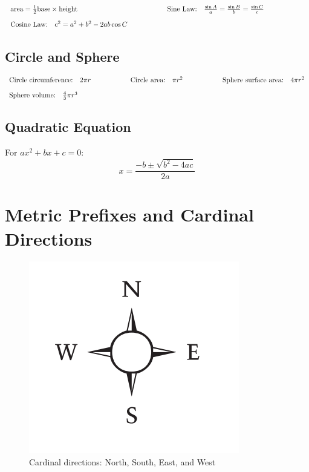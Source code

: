 \documentclass[12pt,a4paper]{article}
\begin{document}
\begin{align*}
  \begin{array}{l@{\hspace{2cm}}l@{\hspace{2cm}}l}
    \text{area} = \frac{1}{2} \text{base} \times \text{height} & \text{Sine Law:} \quad \frac{\sin A}{a} = \frac{\sin B}{b} = \frac{\sin C}{c} & \\[1em]
    \text{Cosine Law:} \quad c^2 = a^2 + b^2 - 2ab \cos C & &
  \end{array}
\end{align*}

\subsection{Circle and Sphere}
\begin{align*}
  \begin{array}{l@{\hspace{2cm}}l@{\hspace{2cm}}l}
    \text{Circle circumference:} \quad 2\pi r & \text{Circle area:} \quad \pi r^2 & \text{Sphere surface area:} \quad 4\pi r^2 \\[1em]
    \text{Sphere volume:} \quad \frac{4}{3}\pi r^3 & &
  \end{array}
\end{align*}

\subsection{Quadratic Equation}
For $ax^2 + bx + c = 0$: 
\[x = \frac{-b \pm \sqrt{b^2 - 4ac}}{2a}\]

\section{Metric Prefixes and Cardinal Directions}
\begin{figure}[H]
    \centering
    \includegraphics[width=0.4\linewidth]{phys11-navigation-compass-directions.png}
    \caption{Cardinal directions: North, South, East, and West}
    \label{fig:Cardinal directions}
\end{figure}
\end{document}

